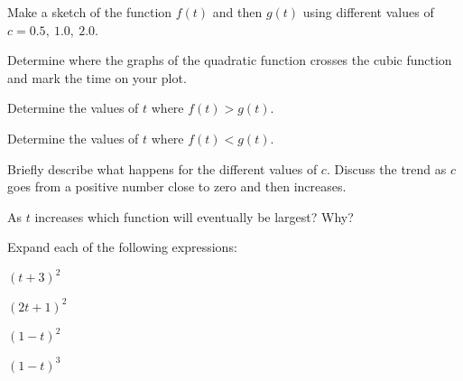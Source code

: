 \begin{problem}
  \scalebox{0.7}{}

  \begin{subproblem}
  \item Make a sketch of the function $f(t)$ and then $g(t)$
    using different values of $c=0.5,~1.0,~2.0$.
  \item Determine where the graphs of the quadratic function crosses the
    cubic function and mark the time on your plot.
    \clearpage
  \item Determine the values of $t$ where $f(t)>g(t)$. 
    \vfill
  \item Determine the values of $t$ where $f(t)<g(t)$.
    \vfill
  \item Briefly describe what happens for the different values of
    $c$. Discuss the trend as $c$ goes from a positive number close to
    zero and then increases.
    \vfill
  \item As $t$ increases which function will eventually be largest?
    Why?
    \vfill
  \end{subproblem}


\end{problem}




\begin{problem}
\item Expand each of the following expressions:
  \begin{subproblem}
    \item $(t+3)^2$
      \vfill
    \item $(2t+1)^2$
      \vfill
    \item $(1-t)^2$
      \vfill
    \item $(1-t)^3$
      \vfill
  \end{subproblem}
\end{problem}


